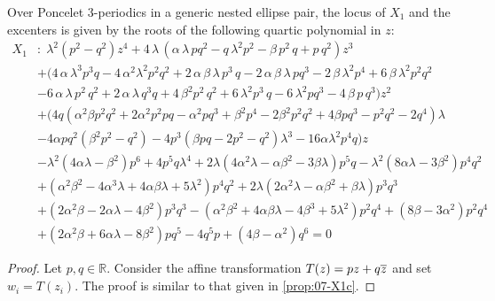 \begin{proposition}
\label{prop:07-X1g}
Over Poncelet 3-periodics in a generic nested ellipse pair, the locus of $X_1$ and the excenters is given by the roots of the following quartic polynomial in $z$:
{\small
\begin{align*}
X_1&: \;{\lambda}^{2} \left( p^2-q^2 \right) {
z}^{4}+4\,\lambda\, \left( \alpha\,\lambda\,p q^2  - q\,{
\lambda}^{2}p^{2}-\beta\,p^2\,q+p\,q^{2} \right) {z}^{3}\\
&+  ( 4\,\alpha\,{
\lambda}^{3}p^{3} q-4\,{\alpha}^{2}{\lambda}^{2}p^{2}q^2 +2\,\alpha\,\beta\,\lambda\,p^{3}
\,q-2\,\alpha\,\beta\,\lambda\,pq^{3} -2\,\beta\,{\lambda}^{2
}p^{4}+6\,\beta\,{\lambda}^{2}p^{2}q^2\\
&-6\,\alpha\,
\lambda\,p^2\,q^{2}+2\,\alpha\,\lambda\,q^{3} q+4\,{
\beta}^{2}p^2\,q^{2}  
  +6\,{\lambda}^{2}p^{3} \,q
 -6\,{
\lambda}^{2} p q^{3}  -4\,\beta\,p\,q^{3}  ) {z}^{
2}\\
&+ ( 4 q (\alpha^2\beta p^2 q^2 + 2\alpha^2 p^2  p q - \alpha^2 p q^3 + \beta^2 p^4 - 2\beta^2 p^2 q^2+ 4\beta p q^3 - p^2 q^2 - 2 q^4)\lambda \\
&- 4\alpha  p q^2 (\beta^2 p^2 - q^2) - 4 p^3 (\beta p  q - 2 p^2 - q^2)\lambda^3 - 16\alpha\lambda^2 p^4   q ) z\\
   & -\lambda^2 (4 \alpha \lambda - \beta^2) p^6 + 4 p^5 q \lambda^4 + 2 \lambda (4 \alpha^2 \lambda - \alpha \beta^2 - 3 \beta \lambda) p^5 q   - \lambda^2 (8 \alpha \lambda - 3 \beta^2) p^4 q^2 \\
   &+ (\alpha^2 \beta^2 -4 \alpha^3 \lambda  + 4 \alpha \beta \lambda + 5 \lambda^2) p^4 q^2 + 2 \lambda (2 \alpha^2 \lambda - \alpha \beta^2 + \beta \lambda) p^3 q^3 \\
   &+ (2 \alpha^2 \beta - 2 \alpha \lambda - 4 \beta^2) p^3 q^3 - (\alpha^2 \beta^2 + 4 \alpha \beta \lambda - 4 \beta^3 + 5 \lambda^2) p^2 q^4 + ( 8 \beta-3 \alpha^2 ) p^2 q^4 \\
   &+ (2 \alpha^2 \beta + 6 \alpha \lambda - 8 \beta^2) p q^5 - 4 q^5 p + ( 4 \beta-\alpha^2 ) q^6=0
\end{align*}
}
\end{proposition}

\begin{proof} Let $p,q\in \mathbb{R}$. Consider the affine transformation
$T(z)=pz+q\overline z$ and set $w_i=T(z_i)$. The proof is similar to that given in \cref{prop:07-X1c}. 
\end{proof}


